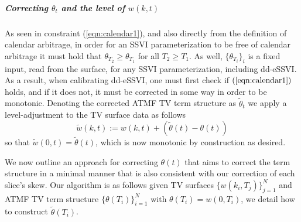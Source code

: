 \documentclass[11pt,letterpaper]{article}
\begin{document}
\subparagraph{Correcting $\theta_t$ and the level of $w(k,t)$}
\label{sss:ATMCorr}
As seen in constraint (\ref{eqn:calendar1}), and also directly from the definition of calendar arbitrage, in order for an SSVI parameterization to be free of calendar arbitrage it must hold that $\theta_{T_2} \geq \theta_{T_1}$ for all $T_2 \geq T_1$. As well, $\{\theta_{T_i}\}_i$ is a fixed input, read from the surface, for any SSVI parameterization, including dd-eSSVI. As a result, when calibrating dd-eSSVI, one must first check if $(\ref{eqn:calendar1})$ holds, and if it does not, it must be corrected in some way in order to be monotonic. Denoting the corrected ATMF TV term structure as $\widetilde{\theta}_t$ we apply a level-adjustment to the TV surface data as follows
\begin{equation}
\widetilde{w}(k,t) := w(k,t) + (\widetilde{\theta}(t) - \theta(t) )
\label{eqn:atmadjust}
\end{equation}
so that $\widetilde{w}(0,t) = \widetilde{\theta}(t)$, which is now monotonic by construction as desired. 

We now outline an approach for correcting $\theta(t)$ that aims to correct the term structure in a minimal manner that is also consistent with our correction of each slice's skew. Our algorithm is as follows given TV surfaces $\{ w(k_i,T_j) \}_{j=1}^N$ and ATMF TV term structure $\{ \theta(T_i) \}_{i=1}^N$ with $\theta(T_i) = w(0,T_i)$, we detail how to construct $\tilde{\theta}(T_i)$. 
\end{document}
